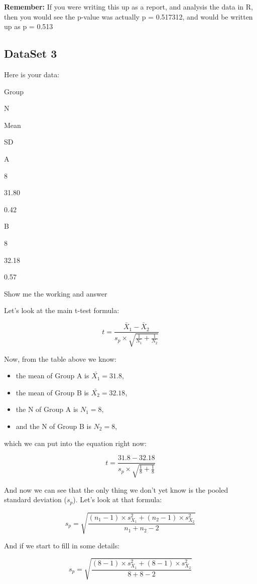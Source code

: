 \documentclass[
  oneside]{book}
\providecommand{\tightlist}{%
  \setlength{\itemsep}{0pt}\setlength{\parskip}{0pt}}
\begin{document}
\textbf{Remember:} If you were writing this up as a report, and analysis the data in R, then you would see the p-value was actually p = 0.517312, and would be written up as p = 0.513

\hypertarget{dataset-3-1}{%
\subsection{DataSet 3}\label{dataset-3-1}}

Here is your data:

Group

N

Mean

SD

A

8

31.80

0.42

B

8

32.18

0.57

Show me the working and answer

Let's look at the main t-test formula:

\[t = \frac{\bar{X}_1 - \bar{X}_2}{s_p \times \sqrt{\frac{1}{N_1} + \frac{1}{N_2}}}\]

Now, from the table above we know:

\begin{itemize}
\tightlist
\item
  the mean of Group A is \(\bar{X_1} = 31.8\),
\item
  the mean of Group B is \(\bar{X_2} = 32.18\),
\item
  the N of Group A is \(N_1 = 8\),
\item
  and the N of Group B is \(N_2 = 8\),
\end{itemize}

which we can put into the equation right now:

\[t = \frac{31.8 - 32.18}{s_p \times \sqrt{\frac{1}{8} + \frac{1}{8}}}\]

And now we can see that the only thing we don't yet know is the pooled standard deviation (\(s_p\)). Let's look at that formula:

\[s_p = \sqrt{\frac{(n_1 -1)  \times s^2_{X_1} + (n_2 -1)\times s^2_{X_2}}{n_1 + n_2 - 2}}\]

And if we start to fill in some details:

\[s_p = \sqrt{\frac{(8 -1)  \times s^2_{X_1} + (8 -1)\times s^2_{X_2}}{8 + 8 - 2}}\]
\end{document}
